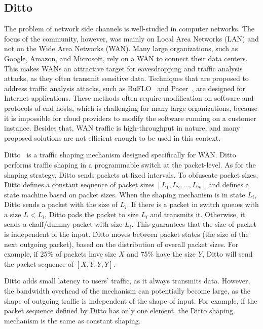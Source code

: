 \subsection{Ditto}\label{subsubsec:ditto}
The problem of network side channels is well-studied in computer networks.
The focus of the community, however, was mainly on Local Area Networks (LAN) and not on the Wide Area Networks (WAN).
Many large organizations, such as Google, Amazon, and Microsoft, rely on a WAN to connect their data centers.
This makes WANs an attractive target for eavesdropping and traffic analysis attacks, as they often transmit sensitive data.
Techniques that are proposed to address traffic analysis attacks, such as BuFLO~\cite{cai2014cs} and Pacer~\cite{mehta2022pacer}, are designed for Internet applications.
These methods often require modification on software and protocols of end hosts, which is challenging for many large organizations, because it is impossible for cloud providers to modify the software running on a customer instance.
Besides that, WAN traffic is high-throughput in nature, and many proposed solutions are not efficient enough to be used in this context.

Ditto~\cite{meier2022ditto} is a traffic shaping mechanism designed specifically for WAN.
Ditto performs traffic shaping in a programmable switch at the packet-level.
As for the shaping strategy, Ditto sends packets at fixed intervals.
To obfuscate packet sizes, Ditto defines a constant sequence of packet sizes $[L_1, L_2, \dots, L_N]$ and defines a state machine based on packet sizes.
When the shaping mechanism is in state $L_i$, Ditto sends a packet with the size of $L_i$.
If there is a packet in switch queues with a size $L < L_i$, Ditto pads the packet to size $L_i$ and transmits it.
Otherwise, it sends a chaff/dummy packet with size $L_i$.
This guarantees that the size of packet is independent of the input.
Ditto moves between packet states (the size of the next outgoing packet), based on the distribution of overall packet sizes.
For example, if 25\% of packets have size $X$ and 75\% have the size $Y$, Ditto will send the packet sequence of $[X, Y, Y, Y]$.

Ditto adds small latency to users' traffic, as it always transmits data.
However, the bandwidth overhead of the mechanism can potentially become large, as the shape of outgoing traffic is independent of the shape of input.
For example, if the packet sequence defined by Ditto has only one element, the Ditto shaping mechanism is the same as constant shaping.  


